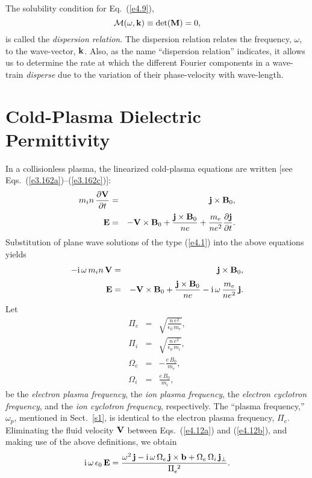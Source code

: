The solubility condition for Eq.~(\ref{e4.9}),
\begin{equation}
{\cal M} (\omega, {\bf k}) \equiv {\rm det}({\bf M}) = 0,
\end{equation}
is called the {\em dispersion relation}. The dispersion relation
relates the frequency, $\omega$, to the wave-vector, ${\bf k}$. 
Also, as the name
``dispersion relation''  indicates, it allows us to determine the rate at which the
different Fourier components in a wave-train {\em disperse}\/ due to
the variation of their phase-velocity with wave-length. 

\section{Cold-Plasma Dielectric Permittivity}\label{s4.3}
In a collisionless plasma, the linearized cold-plasma equations
are written [see Eqs.~(\ref{e3.162a})--(\ref{e3.162c})]:
\begin{eqnarray}
m_i n\,\frac{\partial {\bf V}}{\partial t} &=& {\bf j}\times{\bf B}_0,\\[0.5ex]
{\bf E} &=& - {\bf V}\times{\bf B}_0 +\frac{{\bf j}\times{\bf B}_0}{ne}
+\frac{m_e}{ne^2}\frac{\partial{\bf j}}{\partial t}.
\end{eqnarray}
Substitution of plane wave solutions of the type (\ref{e4.1}) into the above
equations yields
\begin{eqnarray}\label{e4.12a}
-{\rm i}\,\omega\,m_i n\,{\bf V} &=& {\bf j}\times{\bf B}_0,\\[0.5ex]
{\bf E} &=& - {\bf V}\times{\bf B}_0 +\frac{{\bf j}\times{\bf B}_0}{ne}
-{\rm i}\,\omega\,\frac{m_e}{ne^2}\,{\bf j}.\label{e4.12b}
\end{eqnarray}
Let
\begin{eqnarray}
{ \Pi}_e &=& \sqrt{\frac{n\,e^2}{\epsilon_0\,m_e}},\label{e4.13a}\\[0.5ex]
{ \Pi}_i &=& \sqrt{\frac{n\,e^2}{\epsilon_0\,m_i}},\\[0.5ex]
{\Omega}_e &=& -\frac{e\,B_0}{m_e},\\[0.5ex]
{\Omega}_i &=& \frac{e\,B_0}{m_i},\label{e4.13d}
\end{eqnarray}
be the {\em electron plasma frequency}, the {\em ion plasma frequency},
the {\em electron cyclotron frequency}, and the {\em ion cyclotron frequency},
respectively. The ``plasma frequency,'' $\omega_p$, mentioned in Sect.~\ref{s1}, is 
identical
to the electron plasma frequency, ${ \Pi}_e$. Eliminating the
fluid velocity ${\bf V}$ between Eqs.~(\ref{e4.12a}) and (\ref{e4.12b}), and making
use of the above definitions, we obtain
\begin{equation}
{\rm i}\,\omega\,\epsilon_0\,{\bf E} =
\frac{ \omega^2\,{\bf j} 
 - {\rm i}\,\omega\,{\Omega}_e\,{\bf j}\times
{\bf b} + {\Omega}_e\,{\Omega}_i\,{\bf j}_\perp}{{\Pi}_e^{~2}}.
\end{equation}

